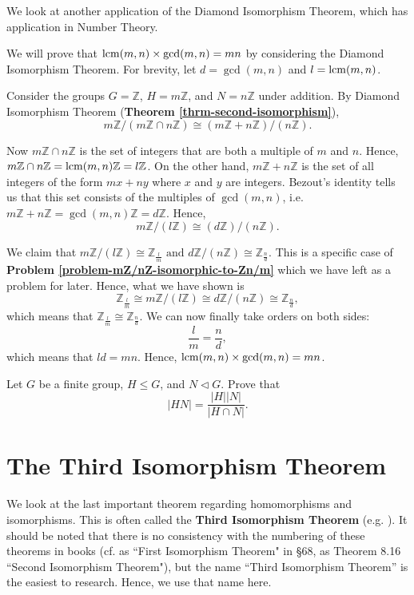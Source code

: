 We look at another application of the Diamond Isomorphism Theorem, which has application in Number Theory.
\begin{example}
    We will prove that $\mathrm{lcm}(m,n)\times\gcd(m,n) = mn$ by considering the Diamond Isomorphism Theorem. For brevity, let $d = \gcd(m,n)$ and $l = \mathrm{lcm}(m,n)$.

    Consider the groups $G = \mathbb{Z}$, $H = m\mathbb{Z}$, and $N = n\mathbb{Z}$ under addition. By Diamond Isomorphism Theorem (\textbf{Theorem \ref{thrm-second-isomorphism}}),
    \[
        m\mathbb{Z}/(m\mathbb{Z} \cap n\mathbb{Z}) \cong (m\mathbb{Z} + n\mathbb{Z})/(n\mathbb{Z}).
    \]

    Now $m\mathbb{Z} \cap n\mathbb{Z}$ is the set of integers that are both a multiple of $m$ and $n$. Hence, $m\mathbb{Z} \cap n\mathbb{Z} = \mathrm{lcm}(m,n)\mathbb{Z} = l\mathbb{Z}$. On the other hand, $m\mathbb{Z} + n\mathbb{Z}$ is the set of all integers of the form $mx+ny$ where $x$ and $y$ are integers. Bezout's identity tells us that this set consists of the multiples of $\gcd(m,n)$, i.e. $m\mathbb{Z} + n\mathbb{Z} = \gcd(m,n)\mathbb{Z} = d\mathbb{Z}$. Hence,
    \[
        m\mathbb{Z}/(l\mathbb{Z}) \cong (d\mathbb{Z})/(n\mathbb{Z}).
    \]

    We claim that $m\mathbb{Z} / (l\mathbb{Z}) \cong \mathbb{Z}_{\frac lm} \text{ and } d\mathbb{Z} / (n\mathbb{Z}) \cong \mathbb{Z}_{\frac nd}$. This is a specific case of \textbf{Problem \ref{problem-mZ/nZ-isomorphic-to-Zn/m}} which we have left as a problem for later. Hence, what we have shown is
    \[
    \mathbb{Z}_{\frac lm} \cong m\mathbb{Z}/(l\mathbb{Z}) \cong d\mathbb{Z}/(n\mathbb{Z}) \cong \mathbb{Z}_{\frac nd},
    \]
    which means that $\mathbb{Z}_{\frac lm} \cong \mathbb{Z}_{\frac nd}$. We can now finally take orders on both sides:
    \[
        \frac{l}{m} = \frac{n}{d},
    \]
    which means that $ld = mn$. Hence, $\mathrm{lcm}(m,n)\times\gcd(m,n) = mn$.
\end{example}

\begin{exercise}\label{exercise-order-of-subgroup-product}
    Let $G$ be a finite group, $H \leq G$, and $N \lhd G$. Prove that
    \[
        |HN| = \frac{|H||N|}{|H \cap N|}.
    \]
\end{exercise}

\newpage

\section{The Third Isomorphism Theorem}
We look at the last important theorem regarding homomorphisms and isomorphisms. This is often called the \textbf{Third Isomorphism Theorem} (e.g. \cite{cohn_1982, hungerford_1980}). It should be noted that there is no consistency with the numbering of these theorems in books (cf. \cite{clark_1984} as ``First Isomorphism Theorem" in \S 68, \cite{humphreys_1996} as Theorem 8.16 ``Second Isomorphism Theorem"), but the name ``Third Isomorphism Theorem'' is the easiest to research. Hence, we use that name here.

